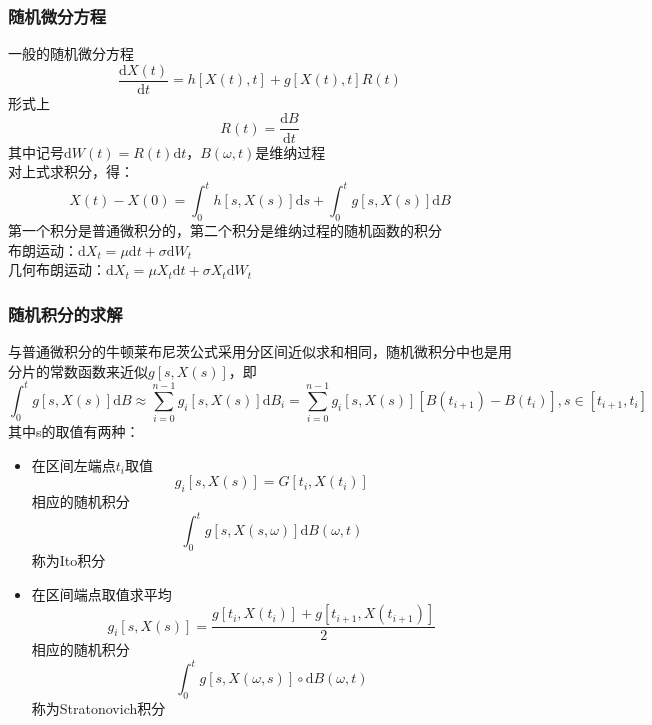 \begin{frame}

\frametitle{随机微分方程}

一般的随机微分方程$$\frac{\mathrm{d}X(t)}{\mathrm{d}t}=h[X(t),t]+g[X(t),t]R(t)$$
形式上$$R(t)=\frac{\mathrm{d}B}{\mathrm{d}t}$$
其中记号$\mathrm{d}W(t)=R(t)\mathrm{d}t$，$B(\omega,t)$是维纳过程 \\
对上式求积分，得：$$X(t)-X(0)=\int_0^t h[s,X(s)]\mathrm{d}s + \int_0^t g[s,X(s)]\mathrm{d}B$$
第一个积分是普通微积分的，第二个积分是维纳过程的随机函数的积分\\
布朗运动：$\mathrm{d}X_t = \mu \mathrm{d}t + \sigma\mathrm{d}W_t$\\
几何布朗运动：$\mathrm{d}X_t = \mu X_t\mathrm{d}t + \sigma X_t\mathrm{d}W_t$

\end{frame}

\begin{frame}

\frametitle{随机积分的求解}
\footnotesize  

与普通微积分的牛顿莱布尼茨公式采用分区间近似求和相同，随机微积分中也是用分片的常数函数来近似$g[s,X(s)]$，即$$\int_0^tg[s,X(s)]\mathrm{d}B \approx \sum_{i=0}^{n-1}g_i[s,X(s)]\mathrm{d}B_i = \sum_{i=0}^{n-1}g_i[s,X(s)][B(t_{i+1})-B(t_i)], s \in [t_{i+1},t_i]$$
其中s的取值有两种：

\begin{itemize}

\item 在区间左端点$t_i$取值$$g_i[s,X(s)]=G[t_i,X(t_i)]$$
相应的随机积分$$\int_0^t g[s,X(s,\omega)]\mathrm{d}B(\omega,t)$$
称为Ito积分

\item 在区间端点取值求平均$$g_i[s,X(s)]=\frac{g[t_i,X(t_i)]+g[t_{i+1},X(t_{i+1})]}{2}$$
相应的随机积分$$\int_0^t g[s,X(\omega,s)]∘\mathrm{d}B(\omega,t)$$
称为Stratonovich积分

\end{itemize}

\end{frame}

